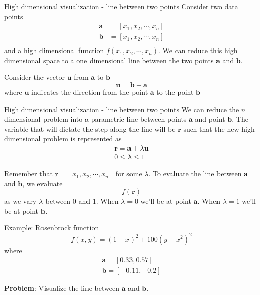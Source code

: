 \documentclass[10pt]{beamer}
\begin{document}
\begin{frame}{High dimensional visualization - line between two points}
Consider two data points 
\begin{align}
\bm{a} &= [x_1, x_2, \cdots, x_n] \\
\bm{b} &= [x_1, x_2, \cdots, x_n] \\
\end{align}
and a high dimensional function $f(x_1, x_2, \cdots, x_n)$. We can reduce this high dimensional space to a one dimensional line between the two points $\bm{a}$ and $\bm{b}$.

Consider the vector $\bm{u}$ from $\bm{a}$ to $\bm{b}$
\begin{equation}
\bm{u} = \bm{b} - \bm{a}
\end{equation}
where $\bm{u}$ indicates the direction from the point $\bm{a}$ to the point $\bm{b}$
\end{frame}

\begin{frame}{High dimensional visualization - line between two points}
We can reduce the $n$ dimensional problem into a parametric line between points $\bm{a}$ and point $\bm{b}$. The variable that will dictate the step along the line will be $\bm{r}$ such that the new high dimensional problem is represented as
\begin{align}
\bm{r} = \bm{a} + \lambda \bm{u} \\
0 \leq \lambda \leq 1
\end{align}

Remember that $\bm{r} = [x_1, x_2, \cdots, x_n]$ for some $\lambda$. To evaluate the line between $\bm{a}$ and $\bm{b}$, we evaluate
\begin{equation}
f(\bm{r})
\end{equation} 
as we vary $\lambda$ between 0 and 1. When $\lambda = 0$ we'll be at point $\bm{a}$. When $\lambda = 1$ we'll be at point $\bm{b}$.  
\end{frame}

\begin{frame}{Example: Rosenbrock function}
\begin{equation}
f(x,y) = (1 - x)^2 + 100(y-x^2)^2
\end{equation}
where 
\begin{align}
\bm{a} = [0.33, 0.57] \\
\bm{b} = [-0.11, -0.2] 
\end{align}

\textbf{Problem}: Visualize the line between $\bm{a}$ and $\bm{b}$.

\end{frame}
\end{document}
